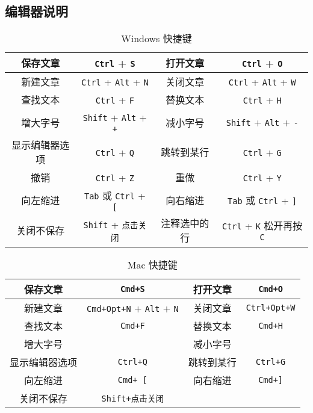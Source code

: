 \subsection{编辑器说明}
\begin{table}[ht]
\centering
\caption{Windows 快捷键}\label{tab_editor_1}
\begin{tabular}{|c|c|c|c|}
\hline
保存文章 & \verb|Ctrl| + \verb|S| & 打开文章 & \verb|Ctrl| + \verb|O| \\
\hline
新建文章 & \verb|Ctrl| + \verb|Alt| + \verb|N| & 关闭文章 & \verb|Ctrl| + \verb|Alt| + \verb|W| \\
\hline
查找文本 & \verb|Ctrl| + \verb|F| & 替换文本 & \verb|Ctrl| + \verb|H| \\
\hline
增大字号 & \verb|Shift| + \verb|Alt| + \verb|+| & 减小字号 & \verb|Shift| + \verb|Alt| + \verb|-| \\
\hline
显示编辑器选项 & \verb|Ctrl| + \verb|Q| & 跳转到某行 & \verb|Ctrl| + \verb|G| \\
\hline
撤销 & \verb`Ctrl` + \verb`Z` & 重做 & \verb`Ctrl` + \verb`Y` \\
\hline
向左缩进 & \verb`Tab` 或 \verb|Ctrl| + \verb|[| & 向右缩进 & \verb`Tab` 或 \verb|Ctrl| + \verb|]| \\
\hline
关闭不保存 & \verb|Shift| + \verb|点击关闭| & 注释选中的行 & \verb`Ctrl` + \verb`K` 松开再按 \verb`C` \\
\hline
\end{tabular}
\end{table}

\begin{table}[ht]
\centering
\caption{Mac 快捷键}\label{tab_editor_2}
\begin{tabular}{|c|c|c|c|}
\hline
保存文章 & \verb|Cmd+S| & 打开文章 & \verb|Cmd+O| \\
\hline
新建文章 & \verb|Cmd+Opt+N| + \verb|Alt| + \verb|N| & 关闭文章 & \verb|Ctrl+Opt+W| \\
\hline
查找文本 & \verb|Cmd+F| & 替换文本 & \verb|Cmd+H| \\
\hline
增大字号 &  & 减小字号 & \\
\hline
显示编辑器选项 & \verb|Ctrl+Q| & 跳转到某行 & \verb|Ctrl+G| \\
\hline
向左缩进 & \verb|Cmd+ [| & 向右缩进 & \verb|Cmd+]| \\
\hline
关闭不保存 & \verb|Shift+点击关闭| &  &  \\
\hline
\end{tabular}
\end{table}

